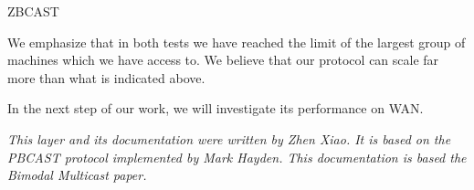 \begin{Layer}{ZBCAST}
\begin{Testing}
We emphasize that in both tests we have reached the limit of the
largest group of machines which we have access to.  We believe that
our protocol can scale far more than what is indicated above.
\item
In the next step of our work, we will investigate its performance on WAN.
\end{Testing}

\emph{This layer and its documentation were written by Zhen Xiao.  It
is based on the \emph{PBCAST} protocol implemented by Mark Hayden.
This documentation is based the \emph{Bimodal Multicast} paper.}
\end{Layer}
